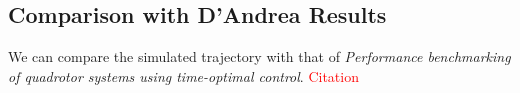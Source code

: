 \documentclass[12pt]{article}
\begin{document}


\subsection{Comparison with D'Andrea Results}

We can compare the simulated trajectory with that of \textit{Performance benchmarking of quadrotor systems using time-optimal control}. \textcolor{red}{Citation} 
\end{document}

